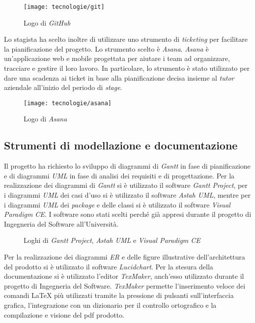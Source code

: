 \begin{figure}[!h] 
    \centering 
    \texttt{[image: tecnologie/git]} 
    \caption{Logo di \textit{GitHub}}
\end{figure}

Lo stagista ha scelto inoltre di utilizzare uno strumento di \textit{ticketing} per facilitare la pianificazione del progetto. Lo strumento scelto è \textit{Asana}. \textit{Asana} è un'applicazione web e mobile progettata per aiutare i team ad organizzare, tracciare e gestire il loro lavoro. In particolare, lo strumento è stato utilizzato per dare una scadenza ai ticket in base alla pianificazione decisa insieme al \textit{tutor} aziendale all'inizio del periodo di \textit{stage}.

\begin{figure}[!h] 
    \centering 
    \texttt{[image: tecnologie/asana]} 
    \caption{Logo di \textit{Asana}}
\end{figure}

\subsection{Strumenti di modellazione e documentazione}

Il progetto ha richiesto lo sviluppo di diagrammi di \textit{Gantt} in fase di pianificazione e di diagrammi \textit{UML} in fase di analisi dei requisiti e di progettazione. Per la realizzazione dei diagrammi di \textit{Gantt} si è utilizzato il software \textit{Gantt Project}, per i diagrammi \textit{UML} dei casi d'uso si è utilizzato il software \textit{Astah UML}, mentre per i diagrammi \textit{UML} dei \textit{package} e delle classi si è utilizzato il software \textit{Visual Paradigm CE}. I software sono stati scelti perché già appresi durante il progetto di Ingegneria del Software all'Università.

\begin{figure}[!h] 
    \centering 
    \caption{Loghi di \textit{Gantt Project}, \textit{Astah UML} e \textit{Visual Paradigm CE}}
\end{figure}

Per la realizzazione dei diagrammi \textit{ER} e delle figure illustrative dell'architettura del prodotto si è utilizzato il software \textit{Lucidchart}. Per la stesura della documentazione si è utilizzato l'editor \textit{TexMaker}, anch'esso utilizzato durante il progetto di Ingegneria del Software. \textit{TexMaker} permette l'inserimento veloce dei comandi \LaTeX{} più utilizzati tramite la pressione di pulsanti sull'interfaccia grafica, l'integrazione con un dizionario per il controllo ortografico e la compilazione e visione del pdf prodotto.

